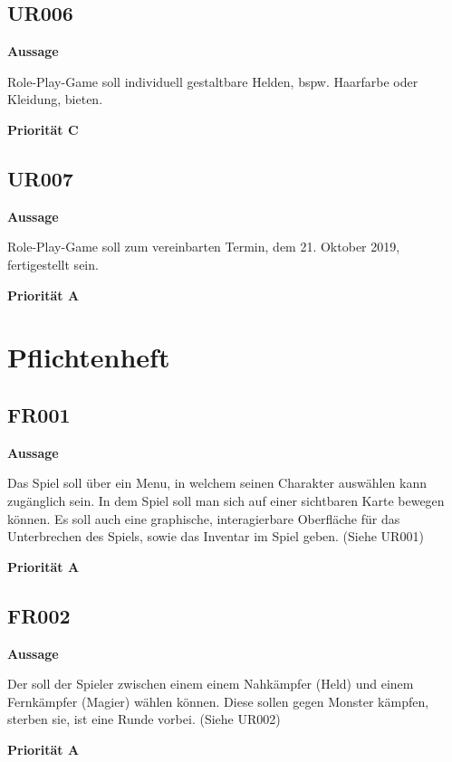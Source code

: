     \subsection{UR006}
        \hspace*{10mm} \textbf{Aussage} 
            \begin{addmargin}{20mm}
                Role-Play-Game soll individuell gestaltbare Helden, bspw. Haarfarbe oder Kleidung, bieten.
            \end{addmargin}
        \hspace*{10mm} \textbf{Priorität C}
    \subsection{UR007}
        \hspace*{10mm} \textbf{Aussage} 
            \begin{addmargin}{20mm}
                Role-Play-Game soll zum vereinbarten Termin, dem 21. Oktober 2019, fertigestellt sein.
            \end{addmargin}
        \hspace*{10mm} \textbf{Priorität A}

\newpage
\section {Pflichtenheft}
\label{Pflichtenheft}
    \subsection{FR001}
        \hspace*{10mm} \textbf{Aussage} 
            \begin{addmargin}{20mm} 
                Das Spiel soll über ein Menu, in welchem seinen Charakter auswählen kann zugänglich sein. In dem Spiel soll man sich auf einer sichtbaren Karte bewegen können. Es soll auch eine graphische, interagierbare Oberfläche für das Unterbrechen des Spiels, sowie das Inventar im Spiel geben. (Siehe UR001)
            \end{addmargin}
        \hspace*{10mm} \textbf{Priorität A}
    \subsection{FR002}
        \hspace*{10mm} \textbf{Aussage} 
            \begin{addmargin}{20mm} 
                Der soll der Spieler zwischen einem einem Nahkämpfer (Held) und einem Fernkämpfer (Magier) wählen können. Diese sollen gegen Monster kämpfen, sterben sie, ist eine Runde vorbei. (Siehe UR002)
            \end{addmargin}
        \hspace*{10mm} \textbf{Priorität A}
